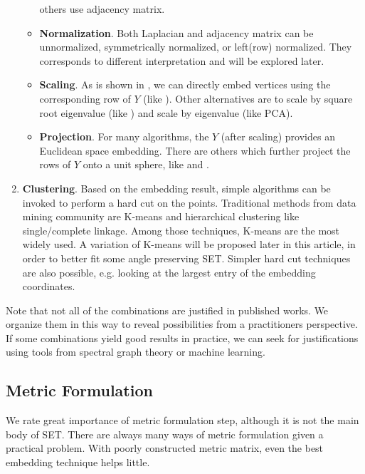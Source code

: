 \begin{enumerate}
\begin{itemize}
					others use \cite{ng2002spectral,brand2003unifying,kannan2004clusterings}
					adjacency matrix. 
				\item \textbf{Normalization}. Both Laplacian and 
					adjacency matrix can be unnormalized, symmetrically normalized, 
					or left(row) normalized\cite{von2007tutorial}. They corresponds to 
					different interpretation and will be explored later. 
				\item \textbf{Scaling}. 
					As is shown in \ralg{\ref{alg:sc_sample}}, we can directly 
					embed vertices using the corresponding row of $Y$
					(like \cite{ng2002spectral}). Other alternatives 
					are to scale by square root eigenvalue (like \cite{brand2003unifying})
					and scale by eigenvalue (like PCA\cite{bishop2006pattern}). 
				\item \textbf{Projection}. For many algorithms, the $Y$ 
					(after scaling) provides an Euclidean space embedding. 
					There are others which further project the rows of $Y$
					onto a unit sphere, like \cite{ng2002spectral} and
					\cite{brand2003unifying}. 
			\end{itemize}
	\item \textbf{Clustering}. 
		Based on the embedding result, simple algorithms can be invoked to 
		perform a hard cut on the points. Traditional methods from data mining
		community are K-means and hierarchical clustering like single/complete
		linkage\cite{jiawei2001data}. Among those techniques, K-means are the most 
		widely used. A variation of K-means will be proposed later in this article,
		in order to better fit some angle preserving SET. Simpler 
		hard cut techniques are also possible, e.g. looking at the largest entry 
		of the embedding coordinates\cite{kannan2004clusterings}.  
\end{enumerate}

Note that not all of the combinations are justified in published works. 
We organize them in this way to reveal possibilities from a practitioners
perspective. If some combinations yield good results in practice, we can 
seek for justifications using tools from spectral graph theory or machine learning. 


\subsection{Metric Formulation}
\label{sec:metric}

We rate great importance of metric formulation step, 
although it is not the main body of SET. 
There are always many ways of metric formulation
given a practical problem. With poorly constructed 
metric matrix, even the best embedding technique helps little.  

